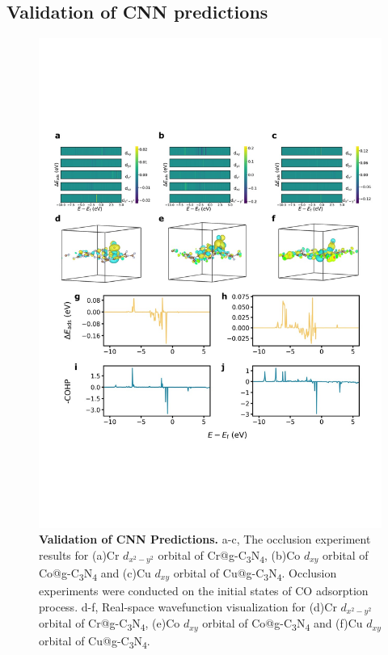 
\subsection{Validation of CNN predictions}

\begin{figure}[htbp]
    \centering
    \includegraphics[width=0.95\linewidth]{main_fig4_validation.JPG}
    \caption{\textbf{Validation of CNN Predictions.}
    a-c, The occlusion experiment results for (a)Cr $d_{x^2-y^2}$ orbital of Cr@g-C\textsubscript{3}N\textsubscript{4}, (b)Co $d_{xy}$ orbital of Co@g-C\textsubscript{3}N\textsubscript{4} and (c)Cu $d_{xy}$ orbital of Cu@g-C\textsubscript{3}N\textsubscript{4}.
    Occlusion experiments were conducted on the initial states of CO adsorption process.
    d-f, Real-space wavefunction visualization for (d)Cr $d_{x^2-y^2}$ orbital of Cr@g-C\textsubscript{3}N\textsubscript{4}, (e)Co $d_{xy}$ orbital of Co@g-C\textsubscript{3}N\textsubscript{4} and (f)Cu $d_{xy}$ orbital of Cu@g-C\textsubscript{3}N\textsubscript{4}.
}
\end{figure}
